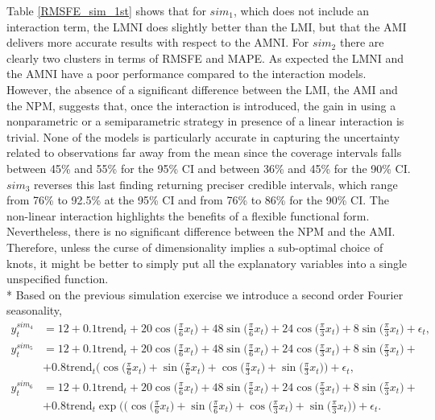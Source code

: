 \documentclass{article}\usepackage[]{graphicx}\usepackage[]{color}
\begin{document}
Table \ref{RMSFE_sim_1st} shows that for $ sim_1 $, which does not include an interaction term, the LMNI does slightly better than the LMI, but that the AMI delivers more accurate results with respect to the AMNI. For $sim_2$ there are clearly two clusters in terms of RMSFE and MAPE. As expected the LMNI and the AMNI have a poor performance compared to the interaction models. However, the absence of a significant difference between the LMI, the AMI and the NPM, suggests that, once the interaction is introduced, the gain in using a nonparametric or a semiparametric strategy in presence of a linear interaction is trivial. None of the models is particularly accurate in capturing the uncertainty related to observations far away from the mean since the coverage intervals falls between 45\% and 55\% for the 95\% CI and between 36\% and 45\% for the 90\% CI.
$ sim_3 $ reverses this last finding returning preciser credible intervals, which range from 76\% to 92.5\% at the 95\% CI and from 76\% to 86\% for the 90\% CI. The non-linear interaction highlights the benefits of a flexible functional form. Nevertheless, there is no significant difference between the NPM and the AMI. Therefore, unless the curse of dimensionality implies a sub-optimal choice of knots, it might be better to simply put all the explanatory variables into a single unspecified function. \\*
Based on the previous simulation exercise we introduce a second order Fourier seasonality, 
\begin{align*}
y_{t}^{sim_{4}} &= 12 + 0.1 \text{trend}_{t} + 20 \cos\bigg(\frac{\pi}{6}x_{t}\bigg) + 48 \sin\bigg(\frac{\pi}{6}x_{t}\bigg) + 24 \cos\bigg(\frac{\pi}{3}x_{t}\bigg) + 8 \sin\bigg(\frac{\pi}{3}x_{t}\bigg) + \epsilon_{t}, \\
y_{t}^{sim_{5}} &= 12 + 0.1 \text{trend}_{t} + 20 \cos\bigg(\frac{\pi}{6}x_{t}\bigg) + 48 \sin\bigg(\frac{\pi}{6}x_{t}\bigg) + 24 \cos\bigg(\frac{\pi}{3}x_{t}\bigg) + 8 \sin\bigg(\frac{\pi}{3}x_{t}\bigg) + \\
&+ 0.8 \text{trend}_{t} \bigg(\cos\bigg(\frac{\pi}{6}x_{t}\bigg) + \sin\bigg(\frac{\pi}{6}x_{t}\bigg) + \cos\bigg(\frac{\pi}{3}x_{t}\bigg) + \sin\bigg(\frac{\pi}{3}x_{t}\bigg)\bigg) + \epsilon_{t}, \\
y_{t}^{sim_{6}} &= 12 + 0.1 \text{trend}_{t} + 20 \cos\bigg(\frac{\pi}{6}x_{t}\bigg) + 48 \sin\bigg(\frac{\pi}{6}x_{t}\bigg) + 24 \cos\bigg(\frac{\pi}{3}x_{t}\bigg) + 8 \sin\bigg(\frac{\pi}{3}x_{t}\bigg) + \\
&+ 0.8 \text{trend}_{t} \exp\bigg(\bigg(\cos\bigg(\frac{\pi}{6}x_{t}\bigg) + \sin\bigg(\frac{\pi}{6}x_{t}\bigg) + \cos\bigg(\frac{\pi}{3}x_{t}\bigg) + \sin\bigg(\frac{\pi}{3}x_{t}\bigg)\bigg) + \epsilon_{t}.
\end{align*}
\end{document}
